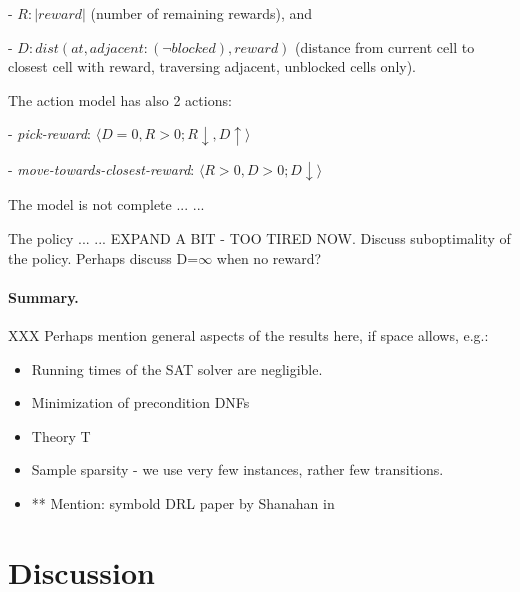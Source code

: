 \documentclass[letterpaper]{article} %
\newcommand{\tuple}[1]{\ensuremath{\langle #1 \rangle}}
\newcommand{\abs}[1]{\ensuremath{\left\vert{#1}\right\vert}}
\begin{document}
- $R: \abs{reward}$ (number of remaining rewards), and

- $D: dist(at, adjacent:(\neg blocked), reward)$ (distance from current cell to closest cell with reward, traversing adjacent, unblocked cells only).

\noindent The action model has also 2 actions:

- \emph{pick-reward}: \tuple{D=0, R > 0;  R \downarrow, D \uparrow}

- \emph{move-towards-closest-reward}: \tuple{R>0, D>0; D \downarrow}

The model is not complete ... 
...

The policy ... 
... EXPAND A BIT - TOO TIRED NOW.
Discuss suboptimality of the policy.
Perhaps discuss D=$\infty$ when no reward?

% 



\paragraph{Summary.}
XXX Perhaps mention general aspects of the results here, if space allows, e.g.:
\begin{itemize}
 \item Running times of the SAT solver are negligible.
 \item Minimization of precondition DNFs
 \item Theory T
 \item Sample sparsity - we use very few instances, rather few transitions.
 \item ** Mention: symbold DRL paper by Shanahan in 
\end{itemize}


\section{Discussion}
\end{document}
